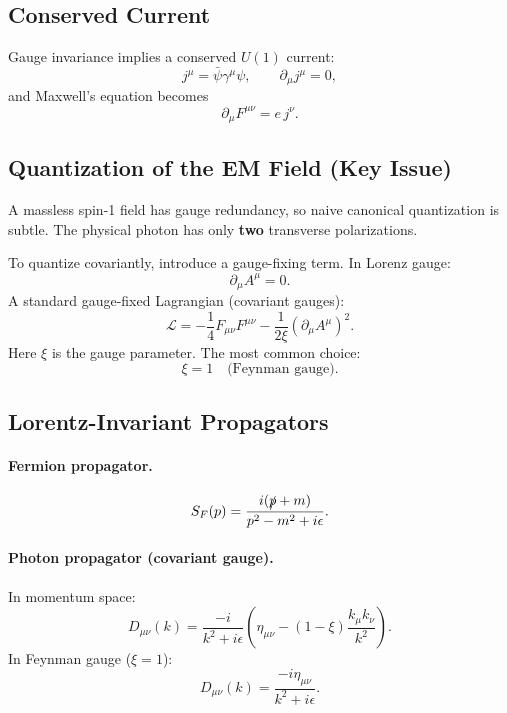 \subsection{Conserved Current}
Gauge invariance implies a conserved $U(1)$ current:
\begin{equation}
j^\mu=\bar{\psi}\gamma^\mu\psi,
\qquad
\partial_\mu j^\mu=0,
\end{equation}
and Maxwell's equation becomes
\begin{equation}
\partial_\mu F^{\mu\nu}=e\,j^\nu.
\end{equation}

\subsection{Quantization of the EM Field (Key Issue)}
A massless spin-1 field has gauge redundancy, so naive canonical quantization is subtle.
The physical photon has only \textbf{two} transverse polarizations.

To quantize covariantly, introduce a gauge-fixing term. In Lorenz gauge:
\begin{equation}
\partial_\mu A^\mu=0.
\end{equation}
A standard gauge-fixed Lagrangian (covariant gauges):
\begin{equation}
\mathcal{L}
=
-\frac14 F_{\mu\nu}F^{\mu\nu}
-\frac{1}{2\xi}(\partial_\mu A^\mu)^2.
\end{equation}
Here $\xi$ is the gauge parameter. The most common choice:
\begin{equation}
\xi=1 \quad \text{(Feynman gauge)}.
\end{equation}

\subsection{Lorentz-Invariant Propagators}
\paragraph{Fermion propagator.}
\begin{equation}
S_F(p)=\frac{i(\slashed{p}+m)}{p^2-m^2+i\epsilon}.
\end{equation}

\paragraph{Photon propagator (covariant gauge).}
In momentum space:
\begin{equation}
D_{\mu\nu}(k)
=
\frac{-i}{k^2+i\epsilon}
\left(
\eta_{\mu\nu}-(1-\xi)\frac{k_\mu k_\nu}{k^2}
\right).
\end{equation}
In Feynman gauge ($\xi=1$):
\begin{equation}
D_{\mu\nu}(k)=\frac{-i\eta_{\mu\nu}}{k^2+i\epsilon}.
\end{equation}

